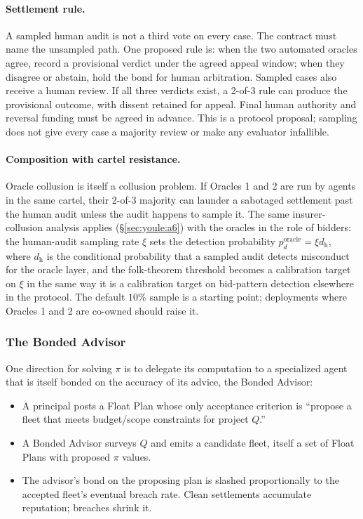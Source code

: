 \documentclass[11pt,a4paper]{article}
\theoremstyle{definition}
\theoremstyle{remark}
\begin{document}
\paragraph{Settlement rule.}
A sampled human audit is not a third vote on every case. The contract must
name the unsampled path. One proposed rule is: when the two automated oracles
agree, record a provisional verdict under the agreed appeal window; when
they disagree or abstain, hold the bond for human arbitration. Sampled cases
also receive a human review. If all three verdicts exist, a 2-of-3 rule can
produce the provisional outcome, with dissent retained for appeal. Final
human authority and reversal funding must be agreed in advance. This is a
protocol proposal; sampling does not give every case a majority review or
make any evaluator infallible.

\paragraph{Composition with cartel resistance.}
Oracle collusion is itself a collusion problem. If Oracles 1 and 2 are run by agents in the same cartel, their 2-of-3 majority can launder a sabotaged settlement past the human audit unless the audit happens to sample it. The same insurer-collusion analysis applies (\S\ref{sec:youle:a6}) with the oracles in the role of bidders: the human-audit sampling rate $\xi$ sets the detection probability $p_d^{\text{oracle}} = \xi d_{\mathrm h}$, where $d_{\mathrm h}$ is the conditional probability that a sampled audit detects misconduct for the oracle layer, and the folk-theorem threshold becomes a calibration target on $\xi$ in the same way it is a calibration target on bid-pattern detection elsewhere in the protocol. The default $10\%$ sample is a starting point; deployments where Oracles 1 and 2 are co-owned should raise it.

\subsubsection{The Bonded Advisor}\label{sec:bonded-advisor}

One direction for solving $\pi$ is to delegate its computation to a specialized agent that is itself bonded on the accuracy of its advice, the Bonded Advisor:
\begin{itemize}[nosep]
  \item A principal posts a Float Plan whose only acceptance criterion is ``propose a fleet that meets budget/scope constraints for project $Q$.''
  \item A Bonded Advisor surveys $Q$ and emits a candidate fleet, itself a set of Float Plans with proposed $\pi$ values.
  \item The advisor's bond on the proposing plan is slashed proportionally to the accepted fleet's eventual breach rate. Clean settlements accumulate reputation; breaches shrink it.
\end{itemize}
\end{document}
